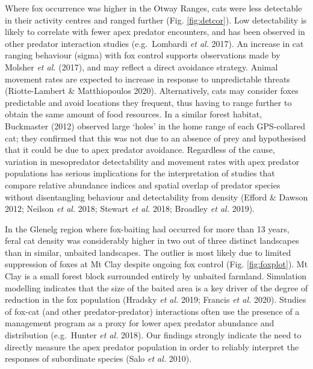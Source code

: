 \documentclass[11pt,a4paper,titlepage,twoside,openright]{style/unimelbthesis}
\begin{document}
\begin{mainmatter}
Where fox occurrence was higher in the Otway Ranges, cats were less detectable in their activity centres and ranged further (Fig. \ref{fig:detcor}). Low detectability is likely to correlate with fewer apex predator encounters, and has been observed in other predator interaction studies (e.g.~Lombardi \emph{et al.} 2017). An increase in cat ranging behaviour (sigma) with fox control supports observations made by Molsher \emph{et al.} (2017), and may reflect a direct avoidance strategy. Animal movement rates are expected to increase in response to unpredictable threats (Riotte-Lambert \& Matthiopoulos 2020). Alternatively, cats may consider foxes predictable and avoid locations they frequent, thus having to range further to obtain the same amount of food resources. In a similar forest habitat, Buckmaster (2012) observed large `holes' in the home range of each GPS-collared cat; they confirmed that this was not due to an absence of prey and hypothesised that it could be due to apex predator avoidance. Regardless of the cause, variation in mesopredator detectability and movement rates with apex predator populations has serious implications for the interpretation of studies that compare relative abundance indices and spatial overlap of predator species without disentangling behaviour and detectability from density (Efford \& Dawson 2012; Neilson \emph{et al.} 2018; Stewart \emph{et al.} 2018; Broadley \emph{et al.} 2019).

In the Glenelg region where fox-baiting had occurred for more than 13 years, feral cat density was considerably higher in two out of three distinct landscapes than in similar, unbaited landscapes. The outlier is most likely due to limited suppression of foxes at Mt Clay despite ongoing fox control (Fig. \ref{fig:foxplot}). Mt Clay is a small forest block surrounded entirely by unbaited farmland. Simulation modelling indicates that the size of the baited area is a key driver of the degree of reduction in the fox population (Hradsky \emph{et al.} 2019; Francis \emph{et al.} 2020). Studies of fox-cat (and other predator-predator) interactions often use the presence of a management program as a proxy for lower apex predator abundance and distribution (e.g.~Hunter \emph{et al.} 2018). Our findings strongly indicate the need to directly measure the apex predator population in order to reliably interpret the responses of subordinate species (Salo \emph{et al.} 2010).


\end{mainmatter}
\end{document}
